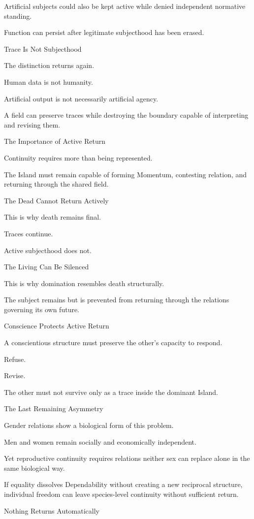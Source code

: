 Artificial subjects could also be kept active while denied independent normative standing.

Function can persist after legitimate subjecthood has been erased.

Trace Is Not Subjecthood

The distinction returns again.

Human data is not humanity.

Artificial output is not necessarily artificial agency.

A field can preserve traces while destroying the boundary capable of interpreting and revising them.

The Importance of Active Return

Continuity requires more than being represented.

The Island must remain capable of forming Momentum, contesting relation, and returning through the shared field.

The Dead Cannot Return Actively

This is why death remains final.

Traces continue.

Active subjecthood does not.

The Living Can Be Silenced

This is why domination resembles death structurally.

The subject remains but is prevented from returning through the relations governing its own future.

Conscience Protects Active Return

A conscientious structure must preserve the other’s capacity to respond.

Refuse.

Revise.

The other must not survive only as a trace inside the dominant Island.

The Last Remaining Asymmetry

Gender relations show a biological form of this problem.

Men and women remain socially and economically independent.

Yet reproductive continuity requires relations neither sex can replace alone in the same biological way.

If equality dissolves Dependability without creating a new reciprocal structure, individual freedom can leave species-level continuity without sufficient return.

Nothing Returns Automatically

